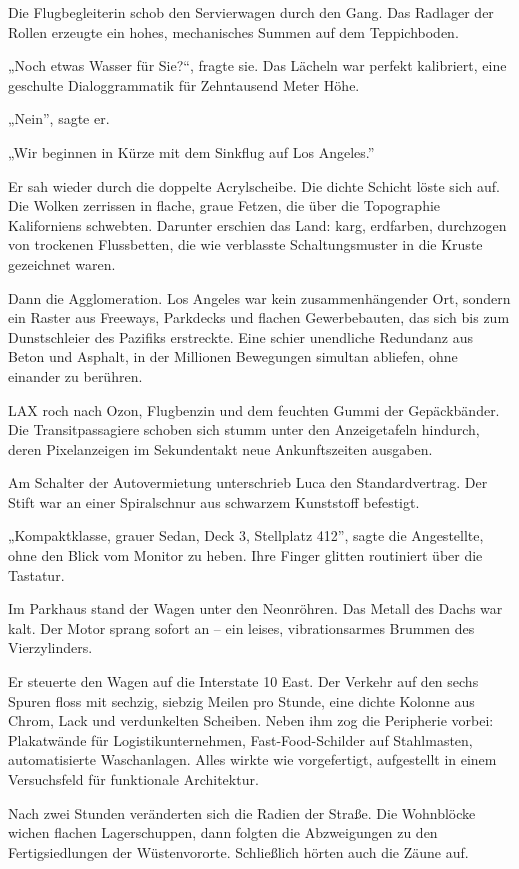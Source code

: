 \documentclass[
  ngerman,
]{article}
\begin{document}
Die Flugbegleiterin schob den Servierwagen durch den Gang. Das Radlager
der Rollen erzeugte ein hohes, mechanisches Summen auf dem Teppichboden.

„Noch etwas Wasser für Sie?{\kern0pt}``, fragte sie. Das Lächeln war
perfekt kalibriert, eine geschulte Dialoggrammatik für Zehntausend Meter
Höhe.

„Nein'', sagte er.

„Wir beginnen in Kürze mit dem Sinkflug auf Los Angeles.''

Er sah wieder durch die doppelte Acrylscheibe. Die dichte Schicht löste
sich auf. Die Wolken zerrissen in flache, graue Fetzen, die über die
Topographie Kaliforniens schwebten. Darunter erschien das Land: karg,
erdfarben, durchzogen von trockenen Flussbetten, die wie verblasste
Schaltungsmuster in die Kruste gezeichnet waren.

Dann die Agglomeration. Los Angeles war kein zusammenhängender Ort,
sondern ein Raster aus Freeways, Parkdecks und flachen Gewerbebauten,
das sich bis zum Dunstschleier des Pazifiks erstreckte. Eine schier
unendliche Redundanz aus Beton und Asphalt, in der Millionen Bewegungen
simultan abliefen, ohne einander zu berühren.

LAX roch nach Ozon, Flugbenzin und dem feuchten Gummi der Gepäckbänder.
Die Transitpassagiere schoben sich stumm unter den Anzeigetafeln
hindurch, deren Pixelanzeigen im Sekundentakt neue Ankunftszeiten
ausgaben.

Am Schalter der Autovermietung unterschrieb Luca den Standardvertrag.
Der Stift war an einer Spiralschnur aus schwarzem Kunststoff befestigt.

„Kompaktklasse, grauer Sedan, Deck 3, Stellplatz 412'', sagte die
Angestellte, ohne den Blick vom Monitor zu heben. Ihre Finger glitten
routiniert über die Tastatur.

Im Parkhaus stand der Wagen unter den Neonröhren. Das Metall des Dachs
war kalt. Der Motor sprang sofort an -- ein leises, vibrationsarmes
Brummen des Vierzylinders.

Er steuerte den Wagen auf die Interstate 10 East. Der Verkehr auf den
sechs Spuren floss mit sechzig, siebzig Meilen pro Stunde, eine dichte
Kolonne aus Chrom, Lack und verdunkelten Scheiben. Neben ihm zog die
Peripherie vorbei: Plakatwände für Logistikunternehmen,
Fast-Food-Schilder auf Stahlmasten, automatisierte Waschanlagen. Alles
wirkte wie vorgefertigt, aufgestellt in einem Versuchsfeld für
funktionale Architektur.

Nach zwei Stunden veränderten sich die Radien der Straße. Die Wohnblöcke
wichen flachen Lagerschuppen, dann folgten die Abzweigungen zu den
Fertigsiedlungen der Wüstenvororte. Schließlich hörten auch die Zäune
auf.
\end{document}
